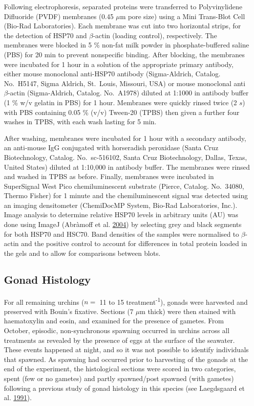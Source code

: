 \documentclass[a4paper,10pt, oneside]{memoir}
\begin{document}
Following electrophoresis, separated proteins were transferred to Polyvinylidene Difluoride (PVDF) membranes (0.45 \(\mu\)m pore size) using a Mini Trans-Blot Cell (Bio-Rad Laboratories).
Each membrane was cut into two horizontal strips, for the detection of HSP70 and \(\beta\)-actin (loading control), respectively.
The membranes were blocked in 5 \% non-fat milk powder in phosphate-buffered saline (PBS) for 20 min to prevent nonspecific binding.
After blocking, the membranes were incubated for 1 hour in a solution of the appropriate primary antibody, either mouse monoclonal anti-HSP70 antibody (Sigma-Aldrich, Catalog. No.~H5147, Sigma Aldrich, St.~Louis, Missouri, USA) or mouse monoclonal anti \(\beta\)-actin (Sigma-Aldrich, Catalog. No.~A1978) diluted at 1:1000 in antibody buffer (1 \% w/v gelatin in PBS) for 1 hour. Membranes were quickly rinsed twice (2 \(s\)) with PBS containing 0.05 \% (v/v) Tween-20 (TPBS) then given a further four washes in TPBS, with each wash lasting for 5 min.

After washing, membranes were incubated for 1 hour with a secondary antibody, an anti-mouse IgG conjugated with horseradish peroxidase (Santa Cruz Biotechnology, Catalog. No.~sc-516102, Santa Cruz Biotechnology, Dallas, Texas, United States) diluted at 1:10,000 in antibody buffer.
The membranes were rinsed and washed in TPBS as before. Finally, membranes were incubated in SuperSignal West Pico chemiluminescent substrate (Pierce, Catalog. No.~34080, Thermo Fisher) for 1 minute and the chemiluminescent signal was detected using an imaging densitometer (ChemiDocMP System, Bio-Rad Laboratories, Inc.).
Image analysis to determine relative HSP70 levels in arbitrary units (AU) was done using ImageJ (Abràmoff et al. \protect\hyperlink{ref-Abramoff2004}{2004}) by selecting grey and black segments for both HSP70 and HSC70.
Band densities of the samples were normalised to \(\beta\)-actin and the positive control to account for differences in total protein loaded in the gels and to allow for comparisons between blots.

\hypertarget{gonad-histology}{%
\subsection{Gonad Histology}\label{gonad-histology}}

For all remaining urchins (\(n =\) 11 to 15 treatment\textsuperscript{-1}), gonads were harvested and preserved with Bouin's fixative.
Sections (7 \(\mu\)m thick) were then stained with haematoxylin and eosin, and examined for the presence of gametes.
From October, episodic, non-synchronous spawning occurred in urchins across all treatments as revealed by the presence of eggs at the surface of the seawater.
These events happened at night, and so it was not possible to identify individuals that spawned.
As spawning had occurred prior to harvesting of the gonads at the end of the experiment, the histological sections were scored in two categories, spent (few or no gametes) and partly spawned/post spawned (with gametes) following a previous study of gonad histology in this species (see Laegdsgaard et al. \protect\hyperlink{ref-Laegdsgaard1991}{1991}).
\end{document}
